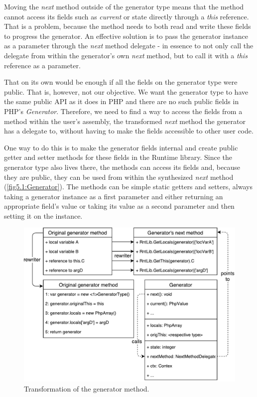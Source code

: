 Moving the \emph{next} method outside of the generator type means that the method cannot access its fields such as \emph{current} or state directly through a \emph{this} reference. That is a problem, because the method needs to both read and write these fields to progress the generator. An effective solution is to pass the generator instance as a parameter through the \emph{next} method delegate - in essence to not only call the delegate from within the generator’s own \emph{next} method, but to call it with a \emph{this} reference as a parameter.

That on its own would be enough if all the fields on the generator type were public. That is, however, not our objective. We want the generator type to have the same public API as it does in PHP and there are no such public fields in PHP’s \emph{Generator}. Therefore, we need to find a way to access the fields from a method within the user’s assembly, the transformed \emph{next} method the generator has a delegate to, without having to make the fields accessible to other user code.

One way to do this is to make the generator fields internal and create public getter and setter methods for these fields in the Runtime library. Since the generator type also lives there, the methods can access its fields and, because they are public, they can be used from within the synthesized \emph{next} method (\autoref{fig5.1:Generator}). The methods can be simple static getters and setters, always taking a generator instance as a first parameter and either returning an appropriate field’s value or taking its value as a second parameter and then setting it on the instance.

\begin{figure}[h]
	\centering	
	\includegraphics[scale=0.70]{../img/5_1_Generator}	
	\caption{Transformation of the generator method.}
	\label{fig5.1:Generator}
\end{figure}

